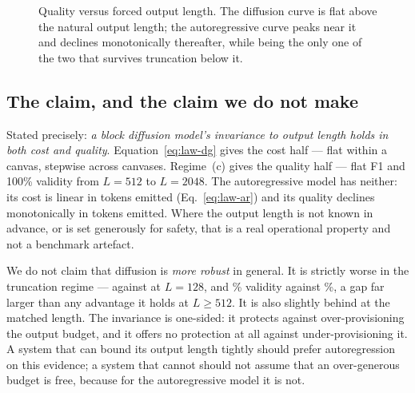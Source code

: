 \begin{figure}[t]
  \centering
  \caption{Quality versus forced output length. The diffusion curve is flat
    above the natural output length; the autoregressive curve peaks near it and
    declines monotonically thereafter, while being the only one of the two that
    survives truncation below it.}
  \label{fig:quality-vs-l}
\end{figure}

\subsection{The claim, and the claim we do not make}
\label{sec:cost-laws:claim}

Stated precisely: \emph{a block diffusion model's invariance to output length
holds in both cost and quality}. Equation~\eqref{eq:law-dg} gives the cost half
--- flat within a canvas, stepwise across canvases. Regime~(c) gives the quality
half --- flat F1 and 100\% validity from $L=512$ to $L=2048$. The
autoregressive model has neither: its cost is linear in tokens emitted
(Eq.~\eqref{eq:law-ar}) and its quality declines monotonically in tokens
emitted. Where the output length is not known in advance, or is set generously
for safety, that is a real operational property and not a benchmark artefact.

We do not claim that diffusion is \emph{more robust} in general. It is strictly
worse in the truncation regime --- \dgFOneOneTwoEight{} against
\arFOneOneTwoEight{} at $L=128$, and \dgValidOneTwoEight\% validity against
\arValidOneTwoEight\%, a gap far larger than any advantage it holds at
$L\ge512$. It is also slightly behind at the matched length. The invariance is
one-sided: it protects against over-provisioning the output budget, and it
offers no protection at all against under-provisioning it. A system that can
bound its output length tightly should prefer autoregression on this evidence;
a system that cannot should not assume that an over-generous budget is free,
because for the autoregressive model it is not.
